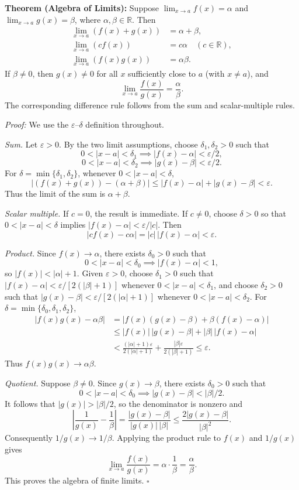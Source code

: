 \documentclass[a4paper,11pt,abstracton]{scrartcl}
\newcommand{\RR}{\mathbb{R}}
\theoremstyle{dotlessP}
\theoremstyle{dotlessS}
\theoremstyle{remark}
\theoremstyle{definition}
\begin{document}
\begin{problem_box}
\textbf{Theorem (Algebra of Limits):}
Suppose $\lim_{x\to a}f(x)=\alpha$ and $\lim_{x\to a}g(x)=\beta$, where $\alpha,\beta\in\RR$. Then
\[
\begin{aligned}
\lim_{x\to a}(f(x)+g(x))&=\alpha+\beta,\\
\lim_{x\to a}(c f(x))&=c\alpha\quad(c\in\RR),\\
\lim_{x\to a}(f(x)g(x))&=\alpha\beta.
\end{aligned}
\]
If $\beta\ne0$, then $g(x)\ne0$ for all $x$ sufficiently close to $a$ (with $x\ne a$), and
\[
\lim_{x\to a}\frac{f(x)}{g(x)}=\frac{\alpha}{\beta}.
\]
The corresponding difference rule follows from the sum and scalar-multiple rules.
\end{problem_box}

\begin{claim_box}
\textit{Proof:}
We use the $\varepsilon$--$\delta$ definition throughout.

\textit{Sum.} Let $\varepsilon>0$. By the two limit assumptions, choose $\delta_1,\delta_2>0$ such that
\[
0<|x-a|<\delta_1\implies |f(x)-\alpha|<\varepsilon/2,
\]
\[
0<|x-a|<\delta_2\implies |g(x)-\beta|<\varepsilon/2.
\]
For $\delta=\min\{\delta_1,\delta_2\}$, whenever $0<|x-a|<\delta$,
\[
|(f(x)+g(x))-(\alpha+\beta)|
\le |f(x)-\alpha|+|g(x)-\beta|<\varepsilon.
\]
Thus the limit of the sum is $\alpha+\beta$.

\textit{Scalar multiple.} If $c=0$, the result is immediate. If $c\ne0$, choose $\delta>0$ so that $0<|x-a|<\delta$ implies $|f(x)-\alpha|<\varepsilon/|c|$. Then
\[
|cf(x)-c\alpha|=|c|\,|f(x)-\alpha|<\varepsilon.
\]

\textit{Product.} Since $f(x)\to\alpha$, there exists $\delta_0>0$ such that
\[
0<|x-a|<\delta_0\implies |f(x)-\alpha|<1,
\]
so $|f(x)|<|\alpha|+1$. Given $\varepsilon>0$, choose $\delta_1>0$ such that $|f(x)-\alpha|<\varepsilon/[2(|\beta|+1)]$ whenever $0<|x-a|<\delta_1$, and choose $\delta_2>0$ such that $|g(x)-\beta|<\varepsilon/[2(|\alpha|+1)]$ whenever $0<|x-a|<\delta_2$. For $\delta=\min\{\delta_0,\delta_1,\delta_2\}$,
\[
\begin{aligned}
|f(x)g(x)-\alpha\beta|
&=|f(x)(g(x)-\beta)+\beta(f(x)-\alpha)|\\
&\le |f(x)|\,|g(x)-\beta|+|\beta|\,|f(x)-\alpha|\\
&<\frac{(|\alpha|+1)\varepsilon}{2(|\alpha|+1)}
 +\frac{|\beta|\varepsilon}{2(|\beta|+1)}\le\varepsilon.
\end{aligned}
\]
Thus $f(x)g(x)\to\alpha\beta$.

\textit{Quotient.} Suppose $\beta\ne0$. Since $g(x)\to\beta$, there exists $\delta_0>0$ such that
\[
0<|x-a|<\delta_0\implies |g(x)-\beta|<|\beta|/2.
\]
It follows that $|g(x)|>|\beta|/2$, so the denominator is nonzero and
\[
\left|\frac1{g(x)}-\frac1\beta\right|
=\frac{|g(x)-\beta|}{|g(x)|\,|\beta|}
\le\frac{2|g(x)-\beta|}{|\beta|^2}.
\]
Consequently $1/g(x)\to1/\beta$. Applying the product rule to $f(x)$ and $1/g(x)$ gives
\[
\lim_{x\to a}\frac{f(x)}{g(x)}=\alpha\cdot\frac1\beta=\frac\alpha\beta.
\]
This proves the algebra of finite limits.
\hfill$\square$
\end{claim_box}
\end{document}
